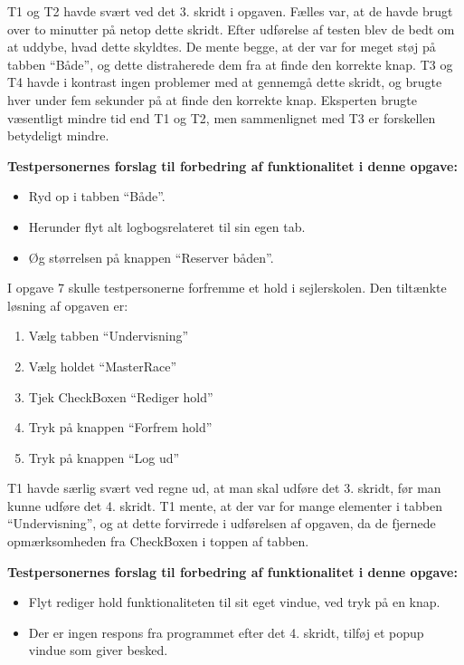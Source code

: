T1 og T2 havde svært ved det 3. skridt i opgaven.
Fælles var, at de havde brugt over to minutter på netop dette skridt.
Efter udførelse af testen blev de bedt om at uddybe, hvad dette skyldtes.
De mente begge, at der var for meget støj på tabben ``Både'', og dette distraherede dem fra at finde den korrekte knap.
T3 og T4 havde i kontrast ingen problemer med at gennemgå dette skridt, og brugte hver under fem sekunder på at finde den korrekte knap. 
Eksperten brugte væsentligt mindre tid end T1 og T2, men sammenlignet med T3 er forskellen betydeligt mindre.

\textbf{Testpersonernes forslag til forbedring af funktionalitet i denne opgave:}
\begin{itemize}
    \item Ryd op i tabben ``Både''. 
    \item Herunder flyt alt logbogsrelateret til sin egen tab.
    \item Øg størrelsen på knappen ``Reserver båden''.
\end{itemize}

I opgave 7 skulle testpersonerne forfremme et hold i sejlerskolen. 
Den tiltænkte løsning af opgaven er:
\begin{enumerate}
    \item Vælg tabben ``Undervisning''
    \item Vælg holdet ``MasterRace''
    \item Tjek CheckBoxen ``Rediger hold''
    \item Tryk på knappen ``Forfrem hold''
    \item Tryk på knappen ``Log ud''
\end{enumerate}

T1 havde særlig svært ved regne ud, at man skal udføre det 3. skridt, før man kunne udføre det 4. skridt.
T1 mente, at der var for mange elementer i tabben ``Undervisning'', og at dette forvirrede i udførelsen af opgaven, da de fjernede opmærksomheden fra CheckBoxen i toppen af tabben.

\textbf{Testpersonernes forslag til forbedring af funktionalitet i denne opgave:}
\begin{itemize}
    \item Flyt rediger hold funktionaliteten til sit eget vindue, ved tryk på en knap.
    \item Der er ingen respons fra programmet efter det 4. skridt, tilføj et popup vindue som giver besked.
\end{itemize}


